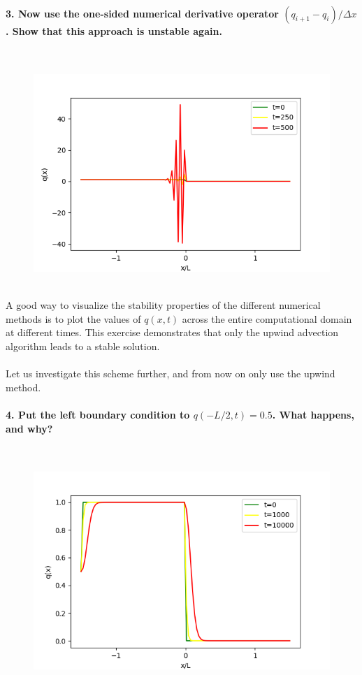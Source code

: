 \paragraph{3. Now use the one-sided numerical derivative 
    operator $(q_{i+1}-q_i)/\Delta x$. Show that this 
    approach is unstable again.
} \ \\
    \begin{figure}[h!]
        \centering
        \includegraphics[width=.6\textwidth]{../figures/downwind_3.png}
        \caption{}
    \end{figure} \ \\ 

\newpage \noindent
A good way to visualize the stability properties of the 
different numerical methods is to plot the values of 
$q(x,t)$ across the entire computational domain at 
different times. This exercise demonstrates that only the 
upwind advection algorithm leads to a stable solution. \\
\\
Let us investigate this scheme further, and from now on 
only use the upwind method.

\paragraph{4. Put the left boundary condition to 
    $q(-L/2,t)=0.5$. What happens, and why?
} \ \\
    \begin{figure}[h!]
        \centering
        \includegraphics[width=.6\textwidth]{../figures/upwind_4.png}
        \caption{}
    \end{figure} \ \\ 

